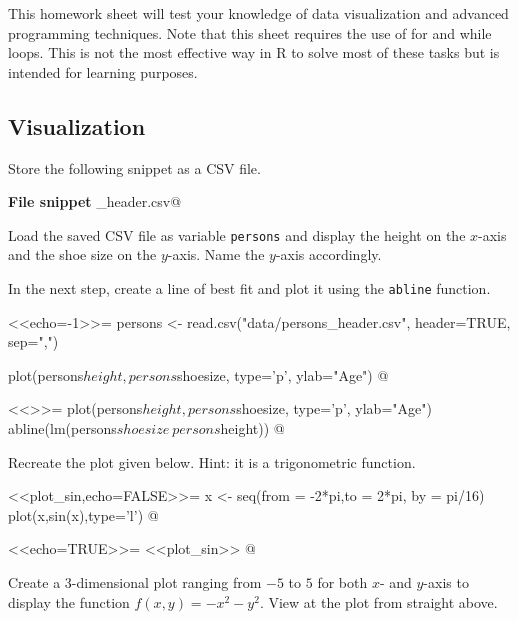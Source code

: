 \documentclass
[answers]
{exercise_sheet}
\begin{document}
  {This homework sheet will test your knowledge of data visualization and advanced programming techniques. Note that this sheet requires the use of for and while loops. This is not the most effective way in R to solve most of these tasks but is intended for learning purposes.}

\subsection*{Visualization}

\begin{Question}{0}
Store the following snippet as a CSV file.

\vspace*{0.5cm}
\textbf{File snippet} \verb@persons_header.csv@

\end{Question}

\begin{Question}{2}
Load the saved CSV file as variable \verb|persons| and display the height on the $x$-axis and the shoe size on the $y$-axis. Name the $y$-axis accordingly.

In the next step, create a line of best fit and plot it using the \verb|abline| function.
\end{Question}

\makeatletter\if@answers\begin{Answer}{5}
<<echo=-1>>=
persons <- read.csv("data/persons_header.csv", header=TRUE, sep=",")

plot(persons$height, persons$shoesize,  type='p', ylab="Age")
@

<<>>=
plot(persons$height, persons$shoesize,  type='p', ylab="Age")
abline(lm(persons$shoesize ~ persons$height))
@
\end{Answer}\fi\makeatother

\begin{Question}{2}
Recreate the plot given below. Hint: it is a trigonometric function.

<<plot_sin,echo=FALSE>>=
x <- seq(from = -2*pi,to = 2*pi, by = pi/16)
plot(x,sin(x),type='l')
@

\end{Question}

\makeatletter\if@answers\begin{Answer}{3}
<<echo=TRUE>>=
<<plot_sin>>
@
\end{Answer}\fi\makeatother

\begin{Question}{5}
Create a 3-dimensional plot ranging from $-5$ to $5$ for both $x$- and $y$-axis to display the function $f(x,y) = -x^2-y^2$. View at the plot from straight above.
\end{Question}
\end{document}
